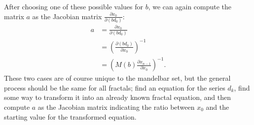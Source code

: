 \documentclass[12pt,a4paper]{article}
\newcommand{\jmat}[2]{\frac{\partial #1}{\partial #2}}
\begin{document}
After choosing one of these possible values for $b$, we can again compute the matrix $a$ as the Jacobian matrix $\jmat{x_0}{(bd_0)}$:
\begin{align*}
	a &= \jmat{x_0}{(bd_0)}\\
	&= \left(\jmat{(bd_0)}{x_0}\right)^{-1}\\
	&= \left(M(b)\jmat{x_{n-1}}{x_0}\right)^{-1}.
\end{align*}
These two cases are of course unique to the mandelbar set, but the general process should be the same for all fractals; find an equation for the series $d_k$, find some way to transform it into an already known fractal equation, and then compute $a$ as the Jacobian matrix indicating the ratio between $x_0$ and the starting value for the transformed equation.
\end{document}
